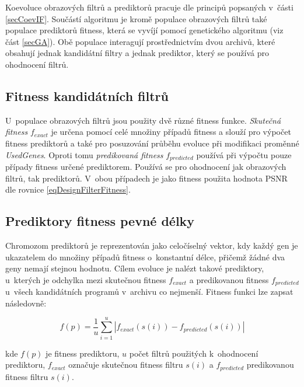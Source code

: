 Koevoluce obrazových filtrů a prediktorů pracuje dle principů popsaných v~části \ref{secCoevIF}. Součástí algoritmu je kromě populace obrazových filtrů také populace prediktorů fitness, která se vyvíjí pomocí genetického algoritmu (viz část \ref{secGA}). Obě populace interagují prostřednictvím dvou archivů, které obsahují jednak kandidátní filtry a jednak prediktor, který se používá pro ohodnocení filtrů.

\subsection{Fitness kandidátních filtrů}

U~populace obrazových filtrů jsou použity dvě různé fitness funkce. \emph{Skutečná fitness} $f_{\mathit{exact}}$ je určena pomocí celé množiny případů fitness a slouží pro výpočet fitness prediktorů a také pro posuzování průběhu evoluce při modifikaci proměnné \emph{UsedGenes}. Oproti tomu \emph{predikovaná fitness} $f_{\mathit{predicted}}$ používá při výpočtu pouze případy fitness určené prediktorem. Používá se pro ohodnocení jak obrazových filtrů, tak prediktorů. V~obou případech je jako fitness použita hodnota PSNR dle rovnice \ref{eqDesignFilterFitness}.

\subsection{Prediktory fitness pevné délky}

Chromozom prediktorů je reprezentován jako celočíselný vektor, kdy každý gen je ukazatelem do množiny případů fitness o~konstantní délce, přičemž žádné dva geny nemají stejnou hodnotu. Cílem evoluce je nalézt takové prediktory, u~kterých je odchylka mezi skutečnou fitness $f_{\mathit{exact}}$ a predikovanou fitness $f_{\mathit{predicted}}$ u~všech kandidátních programů v~archivu co nejmenší. Fitness funkci lze zapsat následovně:

\begin{equation}
    \label{eqDesignPredFitness}
    f \left( p \right) = \frac{1}{u} \sum\limits_{i=1}^{u} \left| f_{\mathit{exact}} \left( s\left( i \right) \right) - f_{\mathit{predicted}} \left( s\left( i \right) \right) \right|
\end{equation}

\noindent{}kde $f \left( p \right)$ je fitness prediktoru, $u$ počet filtrů použitých k~ohodnocení prediktoru, $f_{\mathit{exact}}$ označuje skutečnou fitness filtru $s\left( i \right)$ a $f_{\mathit{predicted}}$ predikovanou fitness filtru $s\left( i \right)$.

